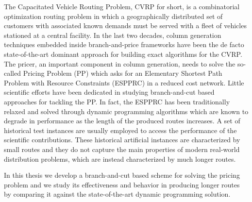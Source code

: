 \noindent The Capacitated Vehicle Routing Problem, CVRP for short,
is a combinatorial optimization routing problem in which
a geographically distributed set of
customers with associated known demands must be served with a fleet of vehicles
stationed at a central facility.
In the last two decades,
column generation techniques embedded inside branch-and-price frameworks
have been the de facto state-of-the-art dominant approach
for building exact algorithms for the CVRP.
The pricer, an important component in column generation, needs to solve
the so-called Pricing Problem (PP) which asks for an
Elementary Shortest Path Problem with Resource Constraints (ESPPRC)
in a reduced cost network.
Little scientific efforts have been dedicated in studying
branch-and-cut based approaches for tackling the PP.
In fact, the ESPPRC has been traditionally relaxed and solved through dynamic programming
algorithms which are known to degrade in performance as
the length of the produced routes increases.
A set of historical test instances are usually employed to access
the performance of the scientific contributions.
These historical artificial instances are characterized by small routes
and they do not capture the main properties of modern real-world distribution
problems,
which are instead characterized by much longer routes.

\noindent In this thesis we develop
a branch-and-cut based scheme for solving the pricing problem
and we study its effectiveness and behavior in producing longer routes
by comparing it against the state-of-the-art dynamic programming solution.
